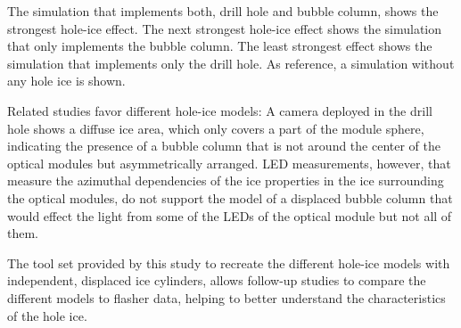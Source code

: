 The simulation that implements both, drill hole and bubble column, shows the strongest hole-ice effect. The next strongest hole-ice effect shows the simulation that only implements the bubble column. The least strongest effect shows the simulation that implements only the drill hole. As reference, a simulation without any hole ice is shown.

Related studies favor different hole-ice models: A camera deployed in the drill hole shows a diffuse ice area, which only covers a part of the module sphere, indicating the presence of a bubble column that is not around the center of the optical modules but asymmetrically arranged. \cite{instrumentation,rongenswedishcamera} LED measurements, however, that measure the azimuthal dependencies of the ice properties in the ice surrounding the optical modules, do not support the model of a displaced bubble column that would effect the light from some of the LEDs of the optical module but not all of them. \cite{rongenswedishcamera}

The tool set provided by this study to recreate the different hole-ice models with independent, displaced ice cylinders, allows follow-up studies to compare the different models to flasher data, helping to better understand the characteristics of the hole ice.\followup